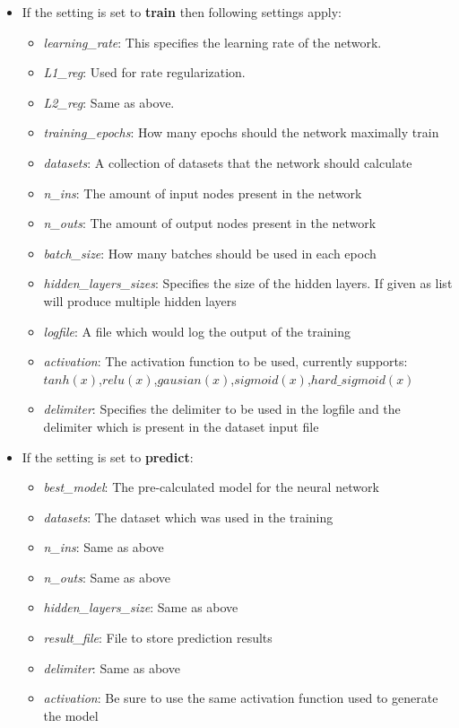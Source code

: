 \documentclass{article}
\begin{document}
\begin{itemize}
    \item If the setting is set to \textbf{train} then following settings apply:
    \begin{itemize}
        \item \emph{learning\_rate}: This specifies the learning rate of the network.
        \item \emph{L1\_reg}: Used for rate regularization. 
        \item \emph{L2\_reg}: Same as above.
        \item \emph{training\_epochs}: How many epochs should the network maximally train
        \item \emph{datasets}: A collection of datasets that the network should calculate
        \item \emph{n\_ins}: The amount of input nodes present in the network
        \item \emph{n\_outs}: The amount of output nodes present in the network
        \item \emph{batch\_size}: How many batches should be used in each epoch
        \item \emph{hidden\_layers\_sizes}: Specifies the size of the hidden layers. If given as list will produce multiple hidden layers
        \item \emph{logfile}: A file which would log the output of the training
        \item \emph{activation}: The activation function to be used, currently supports: $tanh(x)$,$relu(x)$,$gausian(x)$,$sigmoid(x)$,$hard\_sigmoid(x)$
        \item \emph{delimiter}: Specifies the delimiter to be used in the logfile and the delimiter which is present in the dataset input file
    \end{itemize}
    \item If the setting is set to \textbf{predict}:
        \begin{itemize}
            \item \emph{best\_model}: The pre-calculated model for the neural network
            \item \emph{datasets}: The dataset which was used in the training 
            \item \emph{n\_ins}: Same as above
            \item \emph{n\_outs}: Same as above
            \item \emph{hidden\_layers\_size}: Same as above
            \item \emph{result\_file}: File to store prediction results
            \item \emph{delimiter}: Same as above
            \item \emph{activation}: Be sure to use the same activation function used to generate the model
        \end{itemize}
\end{itemize}
\end{document}
